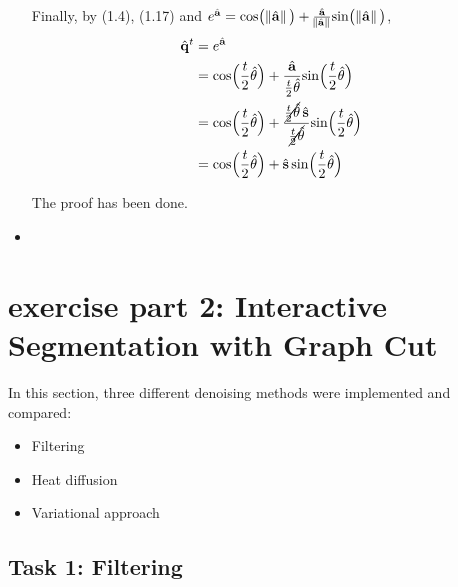 \documentclass[paper=a4, fontsize=11pt]{scrartcl} %
\numberwithin{equation}{section} %
\numberwithin{figure}{section} %
\numberwithin{table}{section} %
\renewcommand{\vec}[1]{\mathbf{#1}}
\begin{document}
\begin{itemize}
	Finally, by (1.4), (1.17) and $e^{\hat{\vec{a}}} = \text{cos} \big( \norm{\hat{\vec{a}}} \big) + \frac{\hat{\vec{a}}}{\norm{\hat{\vec{a}}}} \text{sin} \big( \norm{\hat{\vec{a}}} \big)$, 
	\begin{align}
		\hat{\vec{q}}^t &= e^{\hat{\vec{a}}} \\
		&= \text{cos} \Big( \frac{t}{2} \hat{\theta} \Big) + \frac{\hat{\vec{a}}}{\frac{t}{2}\hat{\theta}} \text{sin} \Big( \frac{t}{2} \hat{\theta} \Big) \\
		&= \text{cos} \Big( \frac{t}{2} \hat{\theta} \Big) + \frac{\cancel{\frac{t}{2} \hat{\theta}} \,\hat{\vec{s}}}{\cancel{\frac{t}{2}\hat{\theta}}} \text{sin} \Big( \frac{t}{2} \hat{\theta} \Big) \\
		&= \text{cos} \Big( \frac{t}{2} \hat{\theta} \Big) + \hat{\vec{s}} \, \text{sin} \Big( \frac{t}{2} \hat{\theta} \Big)
	\end{align}
	
	The proof has been done.
	
	\item 
	
	
\end{itemize}



\section{exercise part 2: Interactive Segmentation with Graph Cut}

In this section, three different denoising methods were implemented and compared:

\begin{itemize}
	\item Filtering
	\item Heat diffusion
	\item Variational approach
\end{itemize}


\subsection{Task 1: Filtering}
\end{document}
